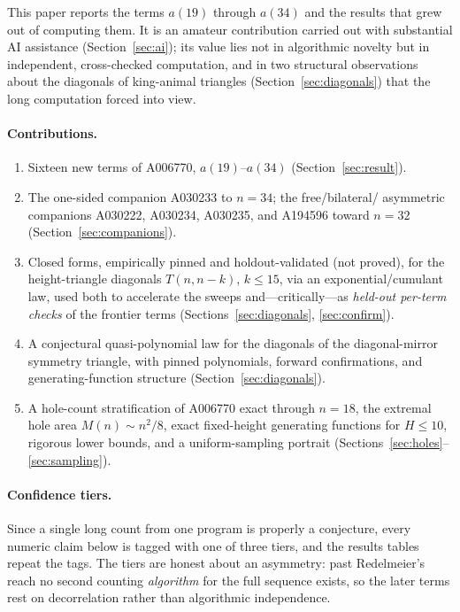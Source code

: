 \documentclass[11pt]{article}
\begin{document}
This paper reports the terms $a(19)$ through $a(34)$ and the results that grew
out of computing them. It is an amateur contribution carried out with
substantial AI assistance (Section~\ref{sec:ai}); its value lies not in
algorithmic novelty but in independent, cross-checked computation, and in two
structural observations about the diagonals of king-animal triangles
(Section~\ref{sec:diagonals}) that the long computation forced into view.

\paragraph{Contributions.}
\begin{enumerate}
  \item Sixteen new terms of A006770, $a(19)$--$a(34)$
        (Section~\ref{sec:result}).
  \item The one-sided companion A030233 to $n=34$; the free/bilateral/
        asymmetric companions A030222, A030234, A030235, and A194596 toward
        $n=32$ (Section~\ref{sec:companions}).
  \item Closed forms, empirically pinned and holdout-validated (not
        proved), for the height-triangle diagonals $T(n,n-k)$, $k\le15$,
        via an exponential/cumulant law, used both to accelerate the sweeps
        and---critically---as \emph{held-out per-term checks} of the
        frontier terms (Sections~\ref{sec:diagonals}, \ref{sec:confirm}).
  \item A conjectural quasi-polynomial law for the diagonals of the diagonal-mirror
        symmetry triangle, with pinned polynomials, forward confirmations,
        and generating-function structure (Section~\ref{sec:diagonals}).
  \item A hole-count stratification of A006770 exact through $n=18$, the
        extremal hole area $M(n)\sim n^2/8$, exact fixed-height generating
        functions for $H\le10$, rigorous lower bounds, and a uniform-sampling
        portrait (Sections~\ref{sec:holes}--\ref{sec:sampling}).
\end{enumerate}

\paragraph{Confidence tiers.}
Since a single long count from one program is properly a conjecture, every
numeric claim below is tagged with one of three tiers, and the results tables
repeat the tags. The tiers are honest about an asymmetry: past Redelmeier's
reach no second counting \emph{algorithm} for the full sequence exists, so the
later terms rest on decorrelation rather than algorithmic independence.
\end{document}
